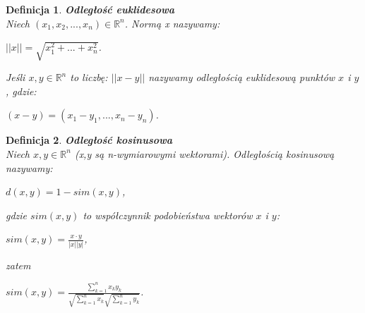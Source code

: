 \documentclass[12pt,a4paper]{report}
\newtheorem{df}{Definicja}
\begin{document}
\begin{df}\textbf{Odległość euklidesowa} %
\\Niech $(x_1,x_2,...,x_n) \in \mathbb{R}^n $.
Normą x nazywamy:
\begin{center}
$||x|| = \sqrt{x_{1}^{2} + ... + x_{n}^{2}}$.
\end{center}
Jeśli $x,y \in \mathbb{R}^n $ to liczbę:
$||x-y||$ nazywamy odległością euklidesową punktów $x$ i $y$, gdzie:
\begin{center}
$(x-y) = (x_1-y_1,...,x_n-y_n)$.
\end{center}
\end{df}
\begin{df}\textbf{Odległość kosinusowa} %
\\Niech $x,y \in \mathbb{R}^n $ (x,y są n-wymiarowymi wektorami). Odległością kosinusową nazywamy:
\begin{center}
$d(x,y) = 1 - sim (x,y)$, 
\end{center}
gdzie $sim (x,y)$ to współczynnik podobieństwa wektorów $x$ i $y$:
\begin{center}
$sim (x,y) = \frac{x \cdot y}{|x||y|}$,
\end{center}
zatem
\begin{center}
$sim (x,y) = \frac{\sum_{k=1}^n x_k y_k}{\sqrt{\sum_{k=1}^n x_k}\sqrt{\sum_{k=1}^n y_k}}$.
\end{center}
\end{df}
\end{document}
